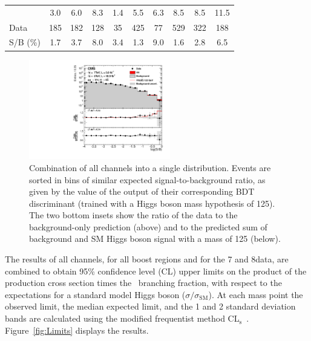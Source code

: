 \documentclass[12pt,twoside,a4paper,cmspaper,final,collab]{cms-tdr}
\begin{document}
\begin{table}[htbp]
\begin{center}
{\begin{tabular}{lccccccccc}
\VH       		   	&	3.0    		&	6.0            &8.3              	&1.4  &5.5               &6.3                &8.5               &8.5               &11.5               \\
Data     		   	&	185         	&	182      	      &128        	&35   &425               &77                 &529               &322               &188                \\ \hline
S/B  (\%)  		   	&	1.7          		&	3.7     		      &8.0	&3.4  &1.3         & 9.0               &1.6             &2.8             &6.5              \\
\hline\hline
\end{tabular}
}
\label{table:3bin_yields}
\end{center}
\end{table}


\begin{figure}[htb]
\begin{center}
\includegraphics[width=0.55\textwidth]{PRD_BDT_Summary_Oct10}
\caption{Combination of all channels into a single distribution. Events are sorted in bins of similar expected signal-to-background
ratio, as given by the value of the output of their corresponding BDT
discriminant (trained with a Higgs boson mass hypothesis of 125\GeV).
The two bottom insets show the ratio of the data to the background-only
prediction (above) and to the predicted sum of background and SM Higgs
boson signal with a mass of 125\GeV
(below).}
    \label{fig:BDT_S_over_B_all}
  \end{center}
\end{figure}


The results of all
channels, for all boost regions and for the 7 and
8\TeV data, are combined to obtain 95\% confidence level (CL) upper limits
on the product of the \VH production cross section times the \HBB\
branching fraction, with respect to the expectations for a standard model
Higgs boson ($\sigma/\sigma_{\mathrm{SM}}$). At
each mass point the observed limit,  the median expected limit, and the 1 and 2 standard
deviation bands are
calculated using the modified frequentist method
CL$_\mathrm{s}$~\cite{Read:2002hq,junkcls,LHC-HCG}. Figure~\ref{fig:Limits}
displays the results.
\end{document}
